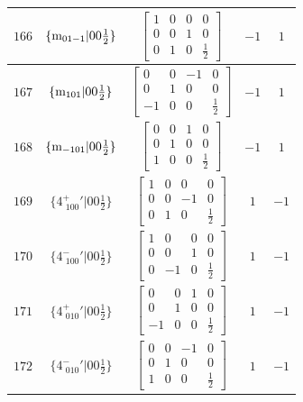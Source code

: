 \documentclass[fleqn,8pt]{jsarticle}
\begin{document}
\begin{longtable}{ccccc}
$ 166 $ & $ \{{\rm m}_{01-1}|0 0 \frac{1}{2}\} $ & $ \begin{bmatrix} 1 & 0 & 0 & 0 \\ 0 & 0 & 1 & 0 \\ 0 & 1 & 0 & \frac{1}{2} \end{bmatrix} $ & $ -1 $ & $ 1 $ \\ \hline
$ 167 $ & $ \{{\rm m}_{101}|0 0 \frac{1}{2}\} $ & $ \begin{bmatrix} 0 & 0 & -1 & 0 \\ 0 & 1 & 0 & 0 \\ -1 & 0 & 0 & \frac{1}{2} \end{bmatrix} $ & $ -1 $ & $ 1 $ \\ \hline
$ 168 $ & $ \{{\rm m}_{-101}|0 0 \frac{1}{2}\} $ & $ \begin{bmatrix} 0 & 0 & 1 & 0 \\ 0 & 1 & 0 & 0 \\ 1 & 0 & 0 & \frac{1}{2} \end{bmatrix} $ & $ -1 $ & $ 1 $ \\ \hline
$ 169 $ & $ \{4^{+}_{\,\,100}{}'|0 0 \frac{1}{2}\} $ & $ \begin{bmatrix} 1 & 0 & 0 & 0 \\ 0 & 0 & -1 & 0 \\ 0 & 1 & 0 & \frac{1}{2} \end{bmatrix} $ & $ 1 $ & $ -1 $ \\ \hline
$ 170 $ & $ \{4^{-}_{\,\,100}{}'|0 0 \frac{1}{2}\} $ & $ \begin{bmatrix} 1 & 0 & 0 & 0 \\ 0 & 0 & 1 & 0 \\ 0 & -1 & 0 & \frac{1}{2} \end{bmatrix} $ & $ 1 $ & $ -1 $ \\ \hline
$ 171 $ & $ \{4^{+}_{\,\,010}{}'|0 0 \frac{1}{2}\} $ & $ \begin{bmatrix} 0 & 0 & 1 & 0 \\ 0 & 1 & 0 & 0 \\ -1 & 0 & 0 & \frac{1}{2} \end{bmatrix} $ & $ 1 $ & $ -1 $ \\ \hline
$ 172 $ & $ \{4^{-}_{\,\,010}{}'|0 0 \frac{1}{2}\} $ & $ \begin{bmatrix} 0 & 0 & -1 & 0 \\ 0 & 1 & 0 & 0 \\ 1 & 0 & 0 & \frac{1}{2} \end{bmatrix} $ & $ 1 $ & $ -1 $ \\ \hline

\end{longtable}
\end{document}
